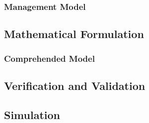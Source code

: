 \subsubsection{Management Model}


\subsection{Mathematical Formulation} %
\label{sub:mathematical_formulation}
\subsubsection{Comprehended Model}

\subsection{Verification and Validation} %
\label{sub:verification_and_validation}


\subsection{Simulation} %
\label{sub:simulation}


